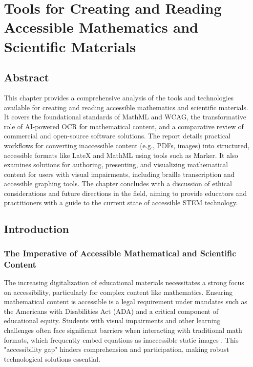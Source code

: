 \chapter{Tools for Creating and Reading Accessible Mathematics and Scientific Materials}\label{ch11:accessible-math}
\raggedright

\section{Abstract}\label{ch11:sec:abstract}
This chapter provides a comprehensive analysis of the tools and technologies available for creating and reading accessible mathematics and scientific materials. It covers the foundational standards of \gls{MathML} and \gls{WCAG}, the transformative role of \gls{AI}-powered \gls{OCR} for mathematical content, and a comparative review of commercial and open-source software solutions. The report details practical workflows for converting inaccessible content (e.g., PDFs, images) into structured, accessible formats like \gls{LateX} and \gls{MathML} using tools such as Marker. It also examines solutions for authoring, presenting, and visualizing mathematical content for users with visual impairments, including braille transcription and accessible graphing tools. The chapter concludes with a discussion of ethical considerations and future directions in the field, aiming to provide educators and practitioners with a guide to the current state of accessible STEM technology.

\section{Introduction}\label{ch11:sec:introduction}
\subsection{The Imperative of Accessible Mathematical and Scientific Content}\label{ch11:ssec:imperative}
The increasing digitalization of educational materials necessitates a strong focus on accessibility, particularly for complex content like mathematics. Ensuring mathematical content is accessible is a legal requirement under mandates such as the Americans with Disabilities Act (ADA) and a critical component of educational equity. Students with visual impairments and other learning challenges often face significant barriers when interacting with traditional math formats, which frequently embed equations as inaccessible static images \supercite{UWAccessibleMath, ChallengesForVisuallyImpairedUsers}. This "accessibility gap" hinders comprehension and participation, making robust technological solutions essential.

